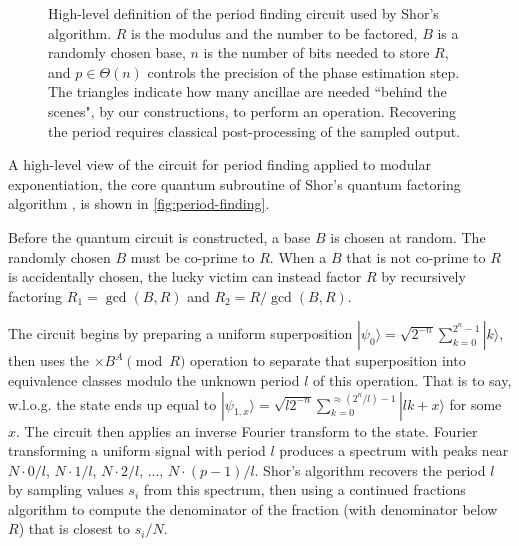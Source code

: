 \documentclass[twocolumn,longbibliography]{quantumarticle-customized}
\begin{document}
\begin{figure}
  \centering
  \caption{
	High-level definition of the period finding circuit \cite{Shor1999} used by Shor's algorithm.
	$R$ is the modulus and the number to be factored, $B$ is a randomly chosen base, $n$ is the number of bits needed to store $R$, and $p \in \Theta(n)$ controls the precision of the phase estimation step.
    The triangles indicate how many ancillae are needed ``behind the scenes", by our constructions, to perform an operation.
	Recovering the period requires classical post-processing of the sampled output.
  }
  \label{fig:period-finding}
\end{figure}

A high-level view of the circuit for period finding applied to modular exponentiation, the core quantum subroutine of Shor's quantum factoring algorithm \cite{Shor1999}, is shown in \autoref{fig:period-finding}.

Before the quantum circuit is constructed, a base $B$ is chosen at random.
The randomly chosen $B$ must be co-prime to $R$.
When a $B$ that is not co-prime to $R$ is accidentally chosen, the lucky victim can instead factor $R$ by recursively factoring $R_1 = \gcd(B, R)$ and $R_2 = R / \gcd(B, R)$.

The circuit begins by preparing a uniform superposition $|\psi_0\rangle = \sqrt{2^{-n}} \sum_{k=0}^{2^n-1} |k\rangle$, then uses the $\times B^A {\pmod R}$ operation to separate that superposition into equivalence classes modulo the unknown period $l$ of this operation.
That is to say, w.l.o.g. the state ends up equal to $|\psi_{1,x}\rangle = \sqrt{l 2^{-n}} \sum_{k=0}^{\approx (2^n/l)-1} |l k + x \rangle$ for some $x$.
The circuit then applies an inverse Fourier transform to the state.
Fourier transforming a uniform signal with period $l$ produces a spectrum with peaks near $N \cdot 0/l$, $N \cdot 1/l$, $N \cdot 2/l$, ..., $N \cdot (p-1)/l$.
Shor's algorithm recovers the period $l$ by sampling values $s_i$ from this spectrum, then using a continued fractions algorithm to compute the denominator of the fraction (with denominator below $R$) that is closest to $s_i/N$.
\end{document}
